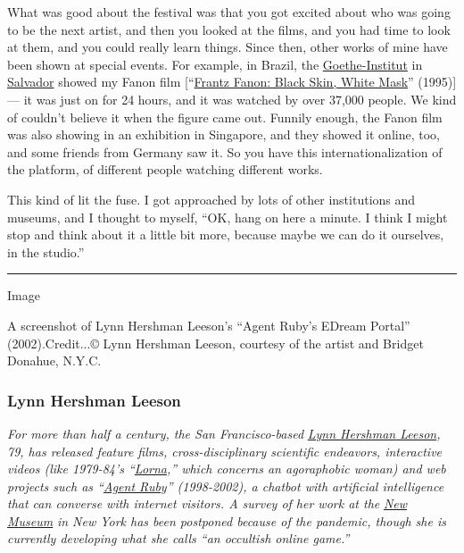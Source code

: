 What was good about the festival was that you got excited about who was
going to be the next artist, and then you looked at the films, and you
had time to look at them, and you could really learn things. Since then,
other works of mine have been shown at special events. For example, in
Brazil, the
\href{https://www.goethe.de/ins/br/pt/sta/sal.html}{Goethe-Institut} in
\href{https://www.nytimes.com/2019/01/24/travel/what-to-do-in-salvador-brazil.html}{Salvador}
showed my Fanon film
{[}``\href{https://www.isaacjulien.com/projects/frantz-fanon-black-skin-white-mask/}{Frantz
Fanon: Black Skin, White Mask}'' (1995){]} --- it was just on for 24
hours, and it was watched by over 37,000 people. We kind of couldn't
believe it when the figure came out. Funnily enough, the Fanon film was
also showing in an exhibition in Singapore, and they showed it online,
too, and some friends from Germany saw it. So you have this
internationalization of the platform, of different people watching
different works.

This kind of lit the fuse. I got approached by lots of other
institutions and museums, and I thought to myself, ``OK, hang on here a
minute. I think I might stop and think about it a little bit more,
because maybe we can do it ourselves, in the studio.''

\begin{center}\rule{0.5\linewidth}{\linethickness}\end{center}

Image

A screenshot of Lynn Hershman Leeson's ``Agent Ruby's EDream Portal''
(2002).Credit...© Lynn Hershman Leeson, courtesy of the artist and
Bridget Donahue, N.Y.C.

\hypertarget{lynn-hershman-leeson}{%
\subsubsection{\texorpdfstring{\textbf{Lynn Hershman
Leeson}}{Lynn Hershman Leeson}}\label{lynn-hershman-leeson}}

\emph{For more than half a century, the San Francisco-based}
\href{https://www.nytimes.com/2019/11/08/arts/design/Lynn-Hershman-Leeson-Shed-art-technology.html}{\emph{Lynn
Hershman Leeson}}\emph{, 79, has released feature films,
cross-disciplinary scientific endeavors, interactive videos (like
1979-84's
``}\href{https://www.lynnhershman.com/lorna/}{\emph{Lorna}}\emph{,''
which concerns an agoraphobic woman) and web projects such as
``}\href{http://www.lynnhershman.com/agent-ruby/}{\emph{Agent
Ruby}}\emph{'' (1998-2002), a chatbot with artificial intelligence that
can converse with internet visitors. A survey of her work at the}
\href{https://www.nytimes.com/topic/organization/new-museum-of-contemporary-art}{\emph{New
Museum}} \emph{in New York has been postponed because of the pandemic,
though she is currently developing what she calls ``an occultish online
game.''}

